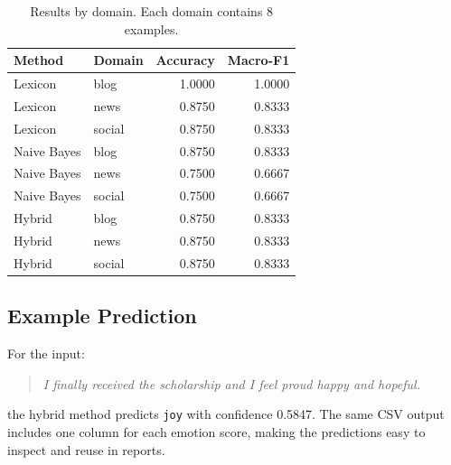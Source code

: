 \begin{table}[h]
\centering
\small
\begin{tabular}{llrr}
\toprule
\textbf{Method} & \textbf{Domain} & \textbf{Accuracy} & \textbf{Macro-F1} \\
\midrule
Lexicon & blog & 1.0000 & 1.0000 \\
Lexicon & news & 0.8750 & 0.8333 \\
Lexicon & social & 0.8750 & 0.8333 \\
Naive Bayes & blog & 0.8750 & 0.8333 \\
Naive Bayes & news & 0.7500 & 0.6667 \\
Naive Bayes & social & 0.7500 & 0.6667 \\
Hybrid & blog & 0.8750 & 0.8333 \\
Hybrid & news & 0.8750 & 0.8333 \\
Hybrid & social & 0.8750 & 0.8333 \\
\bottomrule
\end{tabular}
\caption{Results by domain. Each domain contains 8 examples.}
\label{tab:domain-results}
\end{table}

\subsection{Example Prediction}

For the input:

\begin{quote}
\textit{I finally received the scholarship and I feel proud happy and hopeful.}
\end{quote}

the hybrid method predicts \texttt{joy} with confidence 0.5847. The same CSV output includes one column for each emotion score, making the predictions easy to inspect and reuse in reports.

